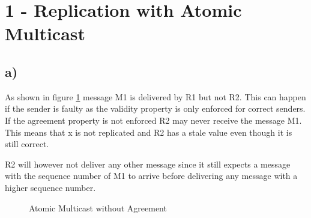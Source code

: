 \documentclass{scrartcl}
\author{Felix Bühler\\2973410 \and Clemens Lieb\\3130838 \and Steffen Wonner\\2862123 \and Fabian Bühler\\2953320}
\title{\gettitle}
\subtitle{\getsubtitle}
\begin{document}
\maketitle

\section*{1 - Replication with Atomic Multicast}

\subsection*{a)}

As shown in figure \ref{fig:1a} message M1 is delivered by R1 but not R2.
This can happen if the sender is faulty as the validity property is only enforced for correct senders.
If the agreement property is not enforced R2 may never receive the message M1.
This means that x is not replicated and R2 has a stale value even though it is still correct.

R2 will however not deliver any other message since it still expects a message with the sequence number of M1 to arrive before delivering any message with a higher sequence number.

\begin{figure}[!ht]
    \centering
    \caption{Atomic Multicast without Agreement}
    \label{fig:1a}
\end{figure}
\end{document}
